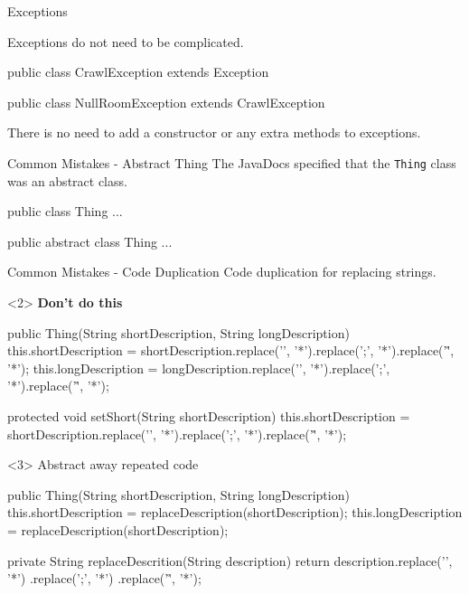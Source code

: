 \documentclass[12]{beamer}
\begin{document}
\begin{frame}[t, fragile]{Exceptions} \vspace{4pt}

Exceptions do not need to be complicated.

\begin{java}
public class CrawlException extends Exception {}

public class NullRoomException extends CrawlException {}
\end{java}

There is no need to add a constructor or any extra methods to exceptions.

\end{frame}

\begin{frame}[t, fragile]{Common Mistakes - Abstract Thing} \vspace{4pt}
The JavaDocs specified that the \texttt{Thing} class was an abstract class.

\begin{java}
public class Thing {
	...
}

public abstract class Thing {
	...
}
\end{java}
\end{frame}

\begin{frame}[t, fragile]{Common Mistakes - Code Duplication} \vspace{4pt}
Code duplication for replacing strings.

\begin{onlyenv}<2>
\textbf{Don't do this}
\begin{java}
public Thing(String shortDescription, String longDescription) {
    this.shortDescription = shortDescription.replace('\n', '*').replace(';', '*').replace('\r', '*');
    this.longDescription = longDescription.replace('\n', '*').replace(';', '*').replace('\r', '*');
}

protected void setShort(String shortDescription) {
    this.shortDescription = shortDescription.replace('\n', '*').replace(';', '*').replace('\r', '*');
}
\end{java}
\end{onlyenv}

\begin{onlyenv}<3>
Abstract away repeated code
\begin{java}
public Thing(String shortDescription, String longDescription) {
    this.shortDescription = replaceDescription(shortDescription);
    this.longDescription = replaceDescription(shortDescription);
}

private String replaceDescrition(String description) {
    return description.replace('\n', '*')
            .replace(';', '*')
            .replace('\r', '*');
}
\end{java}
\end{onlyenv}

\end{frame}
\end{document}
